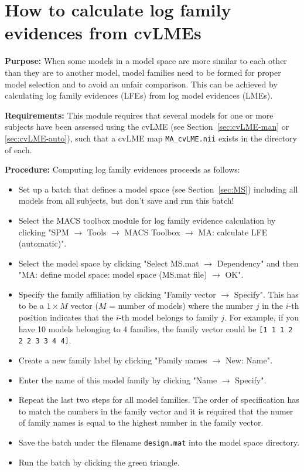 \documentclass[a4paper,12pt]{article}
\newcommand{\ra}{$\rightarrow$ }
\begin{document}
\pagebreak
{}
\section{How to calculate log family evidences from cvLMEs} \label{sec:LFE}

\textbf{Purpose:} When some models in a model space are more similar to each other than they are to another model, model families need to be formed for proper model selection and to avoid an unfair comparison. This can be achieved by calculating log family evidences (LFEs) from log model evidences (LMEs).

\textbf{Requirements:} This module requires that several models for one or more subjects have been assessed using the cvLME (see Section~\ref{sec:cvLME-man} or \ref{sec:cvLME-auto}), such that a cvLME map \texttt{MA\_cvLME.nii} exists in the directory of each.

\textbf{Procedure:} Computing log family evidences proceeds as follows:
\begin{itemize}

\item
Set up a batch that defines a model space (see Section~\ref{sec:MS}) including all models from all subjects, but don't save and run this batch!

\item
Select the MACS toolbox module for log family evidence calculation by clicking \linebreak[4] "SPM \ra Tools \ra MACS Toolbox \ra MA: calculate LFE (automatic)".

\item
Select the model space by clicking "Select MS.mat \ra Dependency" and then \linebreak[4] "MA: define model space: model space (MS.mat file) \ra OK".

\item
Specify the family affiliation by clicking "Family vector \ra Specify". This has to be a $1 \times M$ vector ($M$ = number of models) where the number $j$ in the $i$-th position indicates that the $i$-th model belongs to family $j$. For example, if you have 10 models belonging to 4 families, the family vector could be \texttt{[1 1 1 2 2 2 3 3 4 4]}.

\item
Create a new family label by clicking "Family names \ra New: Name".

\item
Enter the name of this model family by clicking "Name \ra Specify".

\item
Repeat the last two steps for all model families. The order of specification has to match the numbers in the family vector and it is required that the numer of family names is equal to the highest number in the family vector.

\item
Save the batch under the filename \texttt{design.mat} into the model space directory.

\item
Run the batch by clicking the green triangle.
	
\end{itemize}
\end{document}
